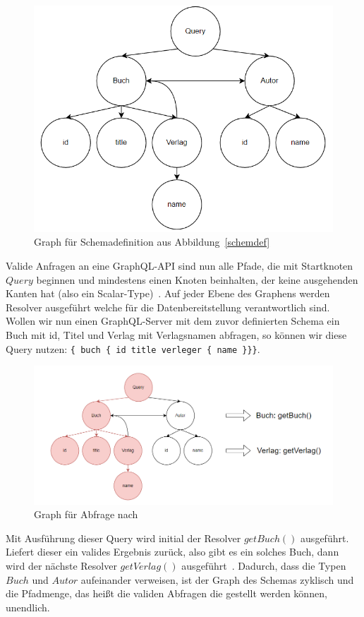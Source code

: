 \begin{figure}[htb]
    \centering
    \includegraphics[width=\textwidth,height=0.4\textheight,keepaspectratio]{img/graph}
    \caption{Graph für Schemadefinition aus Abbildung~\ref{schemdef}}
    \label{schemg}
\end{figure}

Valide Anfragen an eine GraphQL-API sind nun alle Pfade, die mit Startknoten $Query$ beginnen und mindestens einen Knoten beinhalten,
der keine ausgehenden Kanten hat (also ein Scalar-Type)~\cite[vgl. Modelling with GraphQL]{graphqlgraphtheory}.
Auf jeder Ebene des Graphens werden Resolver ausgeführt welche für die Datenbereitstellung verantwortlich sind.
Wollen wir nun einen GraphQL-Server mit dem zuvor definierten Schema ein Buch mit id, Titel und Verlag mit Verlagsnamen abfragen,
so können wir diese Query nutzen: \verb+{ buch { id title verleger { name }}}+.

\begin{figure}[htb]
    \centering
    \includegraphics[width=\textwidth,height=0.4\textheight,keepaspectratio]{img/graphresolver}
    \caption{Graph für Abfrage nach~\cite{graphqlgraphtheory}}
    \label{abfrage}
\end{figure}

Mit Ausführung dieser Query wird initial der Resolver $getBuch()$ ausgeführt.
Liefert dieser ein valides Ergebnis zurück, also gibt es ein solches Buch,
dann wird der nächste Resolver $getVerlag()$ ausgeführt~\cite[vgl. Resolver]{graphqlgraphtheory}.
Dadurch, dass die Typen $Buch$ und $Autor$ aufeinander verweisen, ist der Graph des Schemas zyklisch und die Pfadmenge,
das heißt die validen Abfragen die gestellt werden können, unendlich.
